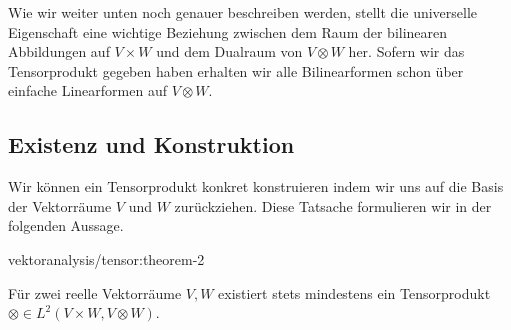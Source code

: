\par
Wie wir weiter unten noch genauer beschreiben werden, stellt die universelle Eigenschaft eine wichtige Beziehung zwischen dem Raum der bilinearen Abbildungen auf \(V\times W\) und dem Dualraum von \(V\otimes W\) her. Sofern wir das Tensorprodukt gegeben haben erhalten wir alle Bilinearformen schon über einfache Linearformen auf \(V\otimes W\).


\subsection{Existenz und Konstruktion}
\label{\detokenize{vektoranalysis/tensor:existenz-und-konstruktion}}
\par
Wir können ein Tensorprodukt konkret konstruieren indem wir uns auf die Basis der Vektorräume \(V\) und \(W\) zurückziehen. Diese Tatsache formulieren wir in der folgenden Aussage.
\begin{theorem}{}{vektoranalysis/tensor:theorem-2}



\par
Für zwei reelle Vektorräume \(V, W\) existiert stets mindestens ein Tensorprodukt \(\otimes\in L^2(V\times W, V\otimes W)\).
\end{theorem}

